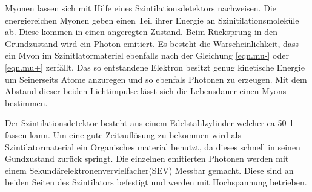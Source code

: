 Myonen lassen sich mit Hilfe eines Szintilationsdetektors nachweisen.
Die energiereichen Myonen geben einen Teil ihrer Energie an Szinitilationsmoleküle ab.
Diese kommen in einen angeregten Zustand.
Beim Rücksprung in den Grundzustand wird ein Photon emitiert.
Es besteht die Warscheinlichkeit, dass ein Myon im Szinitlatormateriel ebenfalls nach der Gleichung \ref{eqn.mu-}
oder \ref{eqn.mu+} zerfällt.
Das so entstandene Elektron besitzt genug kinetische Energie um Seinerseits Atome anzuregen und so ebenfals Photonen zu erzeugen.
Mit dem Abstand dieser beiden Lichtimpulse lässt sich die Lebensdauer einen Myons bestimmen.

Der Szintilationsdetektor besteht aus einem Edelstahlzylinder welcher ca \SI{50}{l} fassen kann.
Um eine gute Zeitauflösung zu bekommen wird als Szintilatormaterial ein Organisches material benutzt,
da dieses schnell in seinen Gundzustand zurück springt.
Die einzelnen emitierten Photonen werden mit einem Sekundärelektronenvervielfacher(SEV) Messbar gemacht.
Diese sind an beiden Seiten des Szintilators befestigt und werden mit Hochspannung betrieben.
